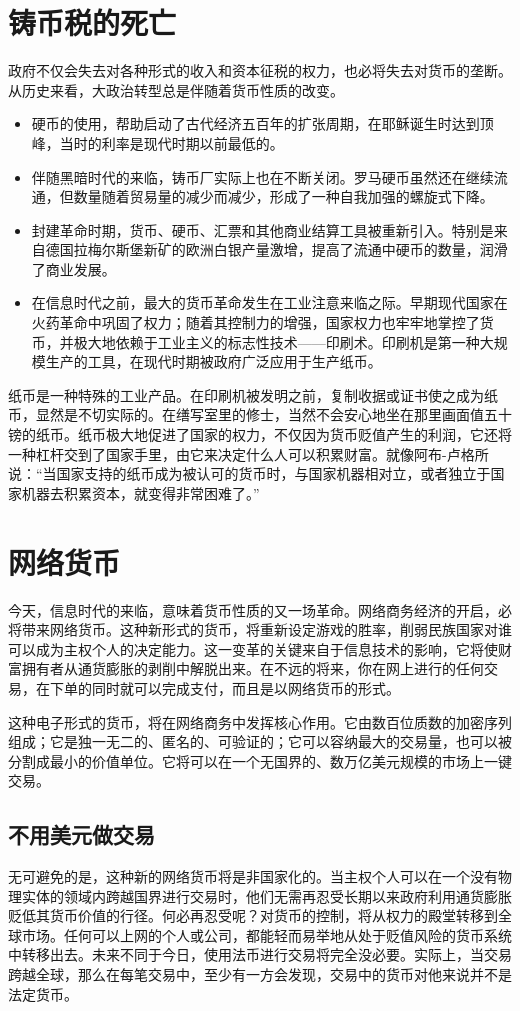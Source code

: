 \section{铸币税的死亡}
政府不仅会失去对各种形式的收入和资本征税的权力，也必将失去对货币的垄断。从历史来看，大政治转型总是伴随着货币性质的改变。
\begin{itemize}
    \item 硬币的使用，帮助启动了古代经济五百年的扩张周期，在耶稣诞生时达到顶峰，当时的利率是现代时期以前最低的。
    \item 伴随黑暗时代的来临，铸币厂实际上也在不断关闭。罗马硬币虽然还在继续流通，但数量随着贸易量的减少而减少，形成了一种自我加强的螺旋式下降。
    \item 封建革命时期，货币、硬币、汇票和其他商业结算工具被重新引入。特别是来自德国拉梅尔斯堡新矿的欧洲白银产量激增，提高了流通中硬币的数量，润滑了商业发展。
    \item 在信息时代之前，最大的货币革命发生在工业注意来临之际。早期现代国家在火药革命中巩固了权力；随着其控制力的增强，国家权力也牢牢地掌控了货币，并极大地依赖于工业主义的标志性技术——印刷术。印刷机是第一种大规模生产的工具，在现代时期被政府广泛应用于生产纸币。
\end{itemize}

纸币是一种特殊的工业产品。在印刷机被发明之前，复制收据或证书使之成为纸币，显然是不切实际的。在缮写室里的修士，当然不会安心地坐在那里画面值五十镑的纸币。纸币极大地促进了国家的权力，不仅因为货币贬值产生的利润，它还将一种杠杆交到了国家手里，由它来决定什么人可以积累财富。就像阿布-卢格所说：“当国家支持的纸币成为被认可的货币时，与国家机器相对立，或者独立于国家机器去积累资本，就变得非常困难了。”

\section{网络货币}
今天，信息时代的来临，意味着货币性质的又一场革命。网络商务经济的开启，必将带来网络货币。这种新形式的货币，将重新设定游戏的胜率，削弱民族国家对谁可以成为主权个人的决定能力。这一变革的关键来自于信息技术的影响，它将使财富拥有者从通货膨胀的剥削中解脱出来。在不远的将来，你在网上进行的任何交易，在下单的同时就可以完成支付，而且是以网络货币的形式。

这种电子形式的货币，将在网络商务中发挥核心作用。它由数百位质数的加密序列组成；它是独一无二的、匿名的、可验证的；它可以容纳最大的交易量，也可以被分割成最小的价值单位。它将可以在一个无国界的、数万亿美元规模的市场上一键交易。

\subsection{不用美元做交易}
无可避免的是，这种新的网络货币将是非国家化的。当主权个人可以在一个没有物理实体的领域内跨越国界进行交易时，他们无需再忍受长期以来政府利用通货膨胀贬低其货币价值的行径。何必再忍受呢？对货币的控制，将从权力的殿堂转移到全球市场。任何可以上网的个人或公司，都能轻而易举地从处于贬值风险的货币系统中转移出去。未来不同于今日，使用法币进行交易将完全没必要。实际上，当交易跨越全球，那么在每笔交易中，至少有一方会发现，交易中的货币对他来说并不是法定货币。

